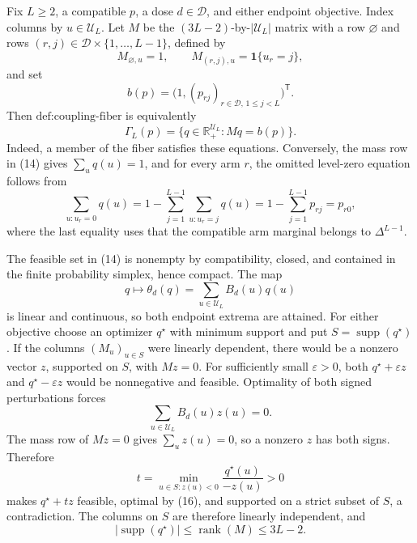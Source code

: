 Fix \(L\geq2\), a compatible \(p\), a dose \(d\in\mathcal D\), and either endpoint objective.  Index columns by \(u\in\mathcal U_L\).  Let \(M\) be the \((3L-2)\)-by-\(|\mathcal U_L|\) matrix with a row \(\varnothing\) and rows \((r,j)\in\mathcal D\times\{1,\ldots,L-1\}\), defined by
\[
 M_{\varnothing,u}=1,
 \qquad
 M_{(r,j),u}=\mathbf 1\{u_r=j\},
\]
and set
\[
 b(p)=\bigl(1,(p_{rj})_{r\in\mathcal D,\,1\leq j<L}\bigr)^{\mathsf T}.
\]
Then \(\text{def:coupling-fiber}\) is equivalently
\[
 \Gamma_L(p)=\{q\in\mathbb R_+^{\mathcal U_L}:Mq=b(p)\}.                    \tag{14}
\]
Indeed, a member of the fiber satisfies these equations.  Conversely, the mass row in (14) gives \(\sum_uq(u)=1\), and for every arm \(r\), the omitted level-zero equation follows from
\[
 \sum_{u:u_r=0}q(u)
 =1-\sum_{j=1}^{L-1}\sum_{u:u_r=j}q(u)
 =1-\sum_{j=1}^{L-1}p_{rj}=p_{r0},                                         \tag{15}
\]
where the last equality uses that the compatible arm marginal belongs to \(\Delta^{L-1}\).

The feasible set in (14) is nonempty by compatibility, closed, and contained in the finite probability simplex, hence compact.  The map
\[
 q\longmapsto\theta_d(q)=\sum_{u\in\mathcal U_L}B_d(u)q(u)
\]
is linear and continuous, so both endpoint extrema are attained.  For either objective choose an optimizer \(q^\star\) with minimum support and put \(S=\operatorname{supp}(q^\star)\).  If the columns \((M_u)_{u\in S}\) were linearly dependent, there would be a nonzero vector \(z\), supported on \(S\), with \(Mz=0\).  For sufficiently small \(\varepsilon>0\), both \(q^\star+\varepsilon z\) and \(q^\star-\varepsilon z\) would be nonnegative and feasible.  Optimality of both signed perturbations forces
\[
 \sum_{u\in\mathcal U_L}B_d(u)z(u)=0.                                      \tag{16}
\]
The mass row of \(Mz=0\) gives \(\sum_uz(u)=0\), so a nonzero \(z\) has both signs.  Therefore
\[
 t=\min_{u\in S:z(u)<0}\frac{q^\star(u)}{-z(u)}>0
\]
makes \(q^\star+tz\) feasible, optimal by (16), and supported on a strict subset of \(S\), a contradiction.  The columns on \(S\) are therefore linearly independent, and
\[
 |\operatorname{supp}(q^\star)|\leq\operatorname{rank}(M)\leq3L-2.          \tag{17}
\]

